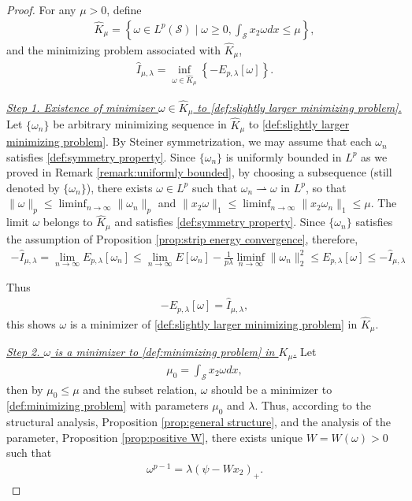 \documentclass[11pt,letterpaper]{amsart}
\theoremstyle{definition}
\theoremstyle{remark}
\renewcommand{\S}{\mathcal{S}}
\numberwithin{equation}{section}
\begin{document}
\begin{proof} 
For any $\mu>0$, define 
\begin{align*}
    \widehat{K}_{\mu}=\left\{ \omega\in L^p(\S) \mid \omega\geq 0, \int_\S x_2\omega dx \leq \mu  \right\},
\end{align*}
and the minimizing problem associated with $\widehat{K}_{\mu}$,
\begin{align}
    \widehat{I}_{\mu,\lambda}=\inf_{\omega\in \widehat{K}_{\mu}}\left\{ -E_{p,\lambda}[\omega] \right\}. \label{def:slightly larger minimizing problem}
\end{align}

\underline{\textit{Step 1. Existence of minimizer $\omega\in \widehat{K}_{\mu}$ to \eqref{def:slightly larger minimizing problem}.}} Let $\{\omega_n\}$ be arbitrary minimizing sequence in $\widehat{K}_{\mu}$ to \eqref{def:slightly larger minimizing problem}. By Steiner symmetrization, we may assume that each $\omega_n$ satisfies \eqref{def:symmetry property}. Since $\{\omega_n\}$ is uniformly bounded in $L^p$ as we proved in Remark \ref{remark:uniformly bounded}, by choosing a subsequence (still denoted by $\{\omega_n\}$), there exists $\omega \in L^p$ such that $\omega_n \rightharpoonup \omega$ in $L^p$, so that $\|\omega\|_p\leq \liminf_{n\to \infty} \|\omega_n\|_p$ and $\|x_2 \omega\|_1\leq \liminf_{n\to \infty} \|x_2 \omega_n\|_1\leq \mu$. The limit $\omega$ belongs to $\widehat{K}_{\mu}$ and satisfies \eqref{def:symmetry property}. Since $\{\omega_n\}$ satisfies the assumption of Proposition \ref{prop:strip energy convergence}, therefore,
\begin{align*}
    -\widehat{I}_{\mu,\lambda} = \lim_{n\rightarrow\infty}E_{p,\lambda}[\omega_n]\leq \lim_{n\rightarrow\infty}E[\omega_n]-\frac{1}{p\lambda}\liminf_{n\rightarrow\infty}\|\omega_n\|_{2}^2 \leq E_{p,\lambda}[\omega]\leq -\widehat{I}_{\mu,\lambda}
\end{align*}

Thus 
\begin{align*}
    -E_{p,\lambda}[\omega] = \widehat{I}_{\mu,\lambda},
\end{align*}
this shows $\omega$ is a minimizer of \ref{def:slightly larger minimizing problem} in $\widehat{K}_{\mu}$. 

\underline{\textit{Step 2. $\omega$ is a minimizer to \eqref{def:minimizing problem} in $K_{\mu}$.}} Let 
\begin{align*}
    \mu_0=\int_{\S} x_2\omega dx,
\end{align*}
then by $\mu_0\leq \mu$ and the subset relation, $\omega$ should be a minimizer to \eqref{def:minimizing problem} with parameters $\mu_0$ and $\lambda$. Thus, according to the structural analysis, Proposition \ref{prop:general structure}, and the analysis of the parameter, Proposition \ref{prop:positive W}, there exists unique $W=W(\omega)>0$ such that 
\begin{align*}
    \omega^{p-1}=\lambda (\psi-Wx_2)_+.
\end{align*}


\end{proof}
\end{document}

